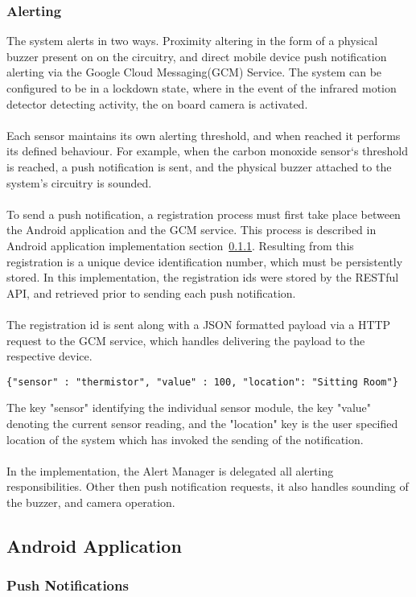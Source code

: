 \documentclass{article}
\begin{document}
\subsubsection{Alerting}

The system alerts in two ways. Proximity altering in the form of a physical buzzer present on on the circuitry, and direct mobile device push notification alerting via the Google Cloud Messaging(GCM) Service. The system can be configured to be in a lockdown state, where in the event of the infrared motion detector detecting activity, the on board camera is activated. \\\\
Each sensor maintains its own alerting threshold, and when reached it performs its defined behaviour. For example, when the carbon monoxide sensor\lq s threshold is reached, a push notification is sent, and the physical buzzer attached to the system’s circuitry is sounded. \\\\
To send a push notification, a registration process must first take place between the Android application and the GCM service. This process is described in Android application implementation section~\ref{sssec:android_push_notifications}. Resulting from this registration is a unique device identification number, which must be persistently stored. In this implementation, the registration ids were stored by the RESTful API, and retrieved prior to sending each push notification. \\\\
The registration id is sent along with a JSON formatted payload via a HTTP request to the GCM service, which handles delivering the payload to the respective device. 
\begin{center}
\begin{lstlisting}[caption={JSON Push Notification Payload Example},label={lst:sms_pn}]
{"sensor" : "thermistor", "value" : 100, "location": "Sitting Room"}
\end{lstlisting}
\end{center}
The key "sensor" identifying the individual sensor module, the key "value" denoting the current sensor reading, and the "location" key is the user specified location of the system which has invoked the sending of the notification. \\\\
In the implementation, the Alert Manager is delegated all alerting responsibilities. Other then push notification requests, it also handles sounding of the buzzer, and camera operation. 
\subsection{Android Application}

\subsubsection{Push Notifications}
\label{sssec:android_push_notifications}



\begin{thebibliography}{fi99}

\end{thebibliography}
\end{document}
